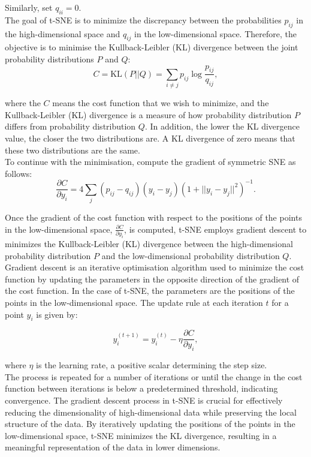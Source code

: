 \documentclass{article}\usepackage[]{graphicx}\usepackage[]{xcolor}
\numberwithin{equation}{section}
\begin{document}
\noindent
Similarly, set $q_{ii}=0$.\\

\noindent
The goal of t-SNE is to minimize the discrepancy between the probabilities 
$p_ {ij}$ in the high-dimensional space and $q_{ij}$ in the low-dimensional space. Therefore, the objective is to minimise the Kullback-Leibler (KL) divergence\cite{vanderMaaten2008tsne} between the joint probability distributions $P$ and $Q$:
    \[
        C = \text{KL}(P || Q) = \sum_{i \neq j} p_{ij} \log \frac{p_{ij}}{q_{ij}},
    \]
    
\noindent
where the $C$ means the cost function that we wish to minimize, and the Kullback-Leibler (KL) divergence is a measure of how probability distribution $P$ differs from probability distribution $Q$. In addition, the lower the KL divergence value, the closer the two distributions are. A KL divergence of zero means that these two distributions are the same.\\

\noindent
To continue with the minimisation, compute the gradient of symmetric SNE\cite{vanderMaaten2008tsne} as follows:
\[\frac{\partial C}{\partial y_i} = 4 \sum_j (p_{ij} - q_{ij})(y_i - y_j)(1 + ||y_i - y_j||^2)^{-1}
.\]

\noindent
Once the gradient of the cost function with respect to the positions of the points in the low-dimensional space, $\frac{\partial C}{\partial y_i}$, is computed, t-SNE employs gradient descent to minimizes the Kullback-Leibler (KL) divergence between the high-dimensional probability distribution $P$ and the low-dimensional probability distribution $Q$. Gradient descent is an iterative optimisation algorithm used to minimize the cost function by updating the parameters in the opposite direction of the gradient of the cost function. In the case of t-SNE, the parameters are the positions of the points in the low-dimensional space. The update rule\cite{vanderMaaten2008tsne} at each iteration $t$ for a point $y_i$ is given by:

\[y_i^{(t+1)} = y_i^{(t)} - \eta \frac{\partial C}{\partial y_i},\]

\noindent
where $\eta$ is the learning rate, a positive scalar determining the step size.\\

\noindent
The process is repeated for a number of iterations or until the change in the cost function between iterations is below a predetermined threshold, indicating convergence. The gradient descent process in t-SNE is crucial for effectively reducing the dimensionality of high-dimensional data while preserving the local structure of the data. By iteratively updating the positions of the points in the low-dimensional space, t-SNE minimizes the KL divergence, resulting in a meaningful representation of the data in lower dimensions.
\end{document}
